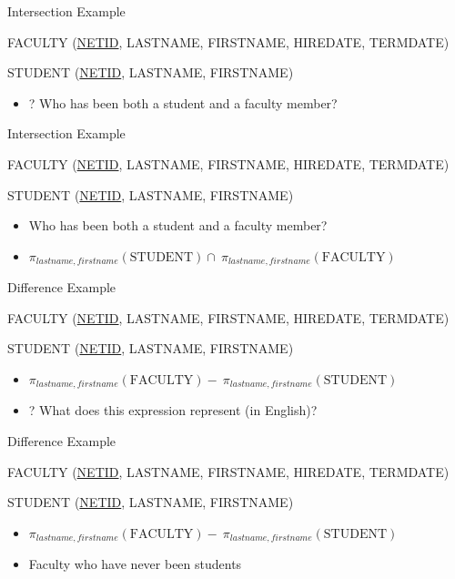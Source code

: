\documentclass[aspectratio=169]{beamer}
\newenvironment{noindentitemize}
{ \begin{itemize}
 \setlength{\itemsep}{1.5ex}
  \setlength{\parsep}{0pt}   
  \setlength{\parskip}{0pt}
 \addtolength{\leftskip}{-2em}
 }
{ \end{itemize} }
\newcommand{\FACULTY}{\textrm{FACULTY}}
\newcommand{\STUDENT}{\textrm{STUDENT}}
\begin{document}

\begin{frame}{Intersection Example}

FACULTY (\underline{NETID}, LASTNAME, FIRSTNAME, HIREDATE, TERMDATE)

STUDENT (\underline{NETID}, LASTNAME, FIRSTNAME)

\begin{noindentitemize}
\item[?] Who has been both a student and a faculty member?
\end{noindentitemize}
\end{frame}

\begin{frame}{Intersection Example}

FACULTY (\underline{NETID}, LASTNAME, FIRSTNAME, HIREDATE, TERMDATE)

STUDENT (\underline{NETID}, LASTNAME, FIRSTNAME)

\begin{noindentitemize}
\item Who has been both a student and a faculty member?
\item $\pi_{lastname, firstname}(\STUDENT) \cap\ \pi_{lastname, firstname}(\FACULTY)$
\end{noindentitemize}
\end{frame}

\begin{frame}{Difference Example}

FACULTY (\underline{NETID}, LASTNAME, FIRSTNAME, HIREDATE, TERMDATE)

STUDENT (\underline{NETID}, LASTNAME, FIRSTNAME)

\begin{noindentitemize}
\item $\pi_{lastname, firstname}(\FACULTY) -\ \pi_{lastname, firstname}(\STUDENT)$
\item[?] What does this expression represent (in English)?
\end{noindentitemize}
\end{frame}

\begin{frame}{Difference Example}

FACULTY (\underline{NETID}, LASTNAME, FIRSTNAME, HIREDATE, TERMDATE)

STUDENT (\underline{NETID}, LASTNAME, FIRSTNAME)

\begin{noindentitemize}
\item $\pi_{lastname, firstname}(\FACULTY) -\ \pi_{lastname, firstname}(\STUDENT)$
\item Faculty who have never been students
\end{noindentitemize}
\end{frame}
\end{document}
